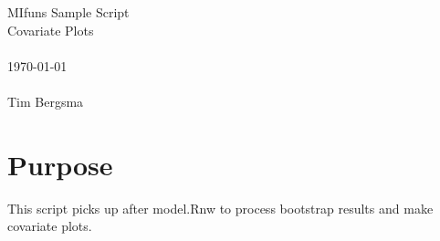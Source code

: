 
\usepackage{Sweave}

 

\vspace*{2cm}
\begin{center}
{\Large MIfuns Sample Script}\\
\vspace{1.5cm}
{\Large Covariate Plots}\\
~\\
\today\\
~\\
Tim Bergsma\\
\end{center}
\newpage

\section{Purpose}
This script picks up after model.Rnw to process bootstrap results and make covariate plots.
